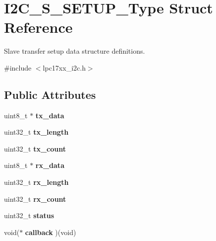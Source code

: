 \hypertarget{struct_i2_c___s___s_e_t_u_p___type}{\section{\-I2\-C\-\_\-\-S\-\_\-\-S\-E\-T\-U\-P\-\_\-\-Type \-Struct \-Reference}
\label{struct_i2_c___s___s_e_t_u_p___type}
}


\-Slave transfer setup data structure definitions.  




{\ttfamily \#include $<$lpc17xx\-\_\-i2c.\-h$>$}

\subsection*{\-Public \-Attributes}
\begin{DoxyCompactItemize}
\item 
\hypertarget{struct_i2_c___s___s_e_t_u_p___type_a229ec9ad1b82bcaf5e71630f63b665ad}{uint8\-\_\-t $\ast$ {\bfseries tx\-\_\-data}}\label{struct_i2_c___s___s_e_t_u_p___type_a229ec9ad1b82bcaf5e71630f63b665ad}

\item 
\hypertarget{struct_i2_c___s___s_e_t_u_p___type_ad21f72ab1857d2701a3ebfd2a925dbb8}{uint32\-\_\-t {\bfseries tx\-\_\-length}}\label{struct_i2_c___s___s_e_t_u_p___type_ad21f72ab1857d2701a3ebfd2a925dbb8}

\item 
\hypertarget{struct_i2_c___s___s_e_t_u_p___type_a968b88959698082dad533dd81e43656c}{uint32\-\_\-t {\bfseries tx\-\_\-count}}\label{struct_i2_c___s___s_e_t_u_p___type_a968b88959698082dad533dd81e43656c}

\item 
\hypertarget{struct_i2_c___s___s_e_t_u_p___type_aeed334f26b9cca81f76351a38ddc4925}{uint8\-\_\-t $\ast$ {\bfseries rx\-\_\-data}}\label{struct_i2_c___s___s_e_t_u_p___type_aeed334f26b9cca81f76351a38ddc4925}

\item 
\hypertarget{struct_i2_c___s___s_e_t_u_p___type_ad0b62497c002a48eb3872a3955d66070}{uint32\-\_\-t {\bfseries rx\-\_\-length}}\label{struct_i2_c___s___s_e_t_u_p___type_ad0b62497c002a48eb3872a3955d66070}

\item 
\hypertarget{struct_i2_c___s___s_e_t_u_p___type_a63f72aed2db5a0faa6fe4c55b6777781}{uint32\-\_\-t {\bfseries rx\-\_\-count}}\label{struct_i2_c___s___s_e_t_u_p___type_a63f72aed2db5a0faa6fe4c55b6777781}

\item 
\hypertarget{struct_i2_c___s___s_e_t_u_p___type_ad8439ad083dc96c994cb0cf94755e87f}{uint32\-\_\-t {\bfseries status}}\label{struct_i2_c___s___s_e_t_u_p___type_ad8439ad083dc96c994cb0cf94755e87f}

\item 
\hypertarget{struct_i2_c___s___s_e_t_u_p___type_acdeec18ef6156e1e983975b82e08729e}{void($\ast$ {\bfseries callback} )(void)}\label{struct_i2_c___s___s_e_t_u_p___type_acdeec18ef6156e1e983975b82e08729e}

\end{DoxyCompactItemize}


